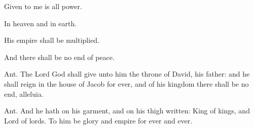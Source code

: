 \documentclass[12pt]{book}
\begin{document}

\myrule
 
\begin{enpars} \noindent \vv Given to me is all power.

\noindent \rr In heaven and in earth.
 \end{enpars}
 
 \myrule

\begin{enpars} \noindent \vv His empire shall be multiplied.

\noindent \rr And there shall be no end of peace.
 \end{enpars}
 

\myrule

 
 \begin{enpars} \noindent Ant. The Lord God shall give unto him the throne of David, his father: and he shall reign in the house of Jacob for ever, and of his kingdom there shall be no end, alleluia. \end{enpars}
 
 \myrule

 
 \begin{enpars} \noindent Ant. And he hath on his garment, and on his thigh written: King of kings, and Lord of lords. To him be glory and empire for ever and ever. \end{enpars}



\end{document}
